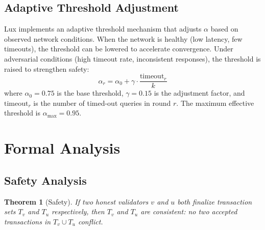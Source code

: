 \documentclass[11pt,a4paper]{article}
\newtheorem{theorem}{Theorem}[section]
\begin{document}
\subsection{Adaptive Threshold Adjustment}

Lux implements an adaptive threshold mechanism that adjusts $\alpha$ based on observed
network conditions. When the network is healthy (low latency, few timeouts), the threshold
can be lowered to accelerate convergence. Under adversarial conditions (high timeout rate,
inconsistent responses), the threshold is raised to strengthen safety:
\begin{equation}
\alpha_r = \alpha_0 + \gamma \cdot \frac{\text{timeout}_r}{k}
\end{equation}
where $\alpha_0 = 0.75$ is the base threshold, $\gamma = 0.15$ is the adjustment factor,
and $\text{timeout}_r$ is the number of timed-out queries in round $r$. The maximum
effective threshold is $\alpha_{\max} = 0.95$.

\section{Formal Analysis}
\label{sec:analysis}

\subsection{Safety Analysis}

\begin{theorem}[Safety]
\label{thm:safety}
If two honest validators $v$ and $u$ both finalize transaction sets $T_v$ and $T_u$
respectively, then $T_v$ and $T_u$ are consistent: no two accepted transactions in
$T_v \cup T_u$ conflict.
\end{theorem}
\end{document}
